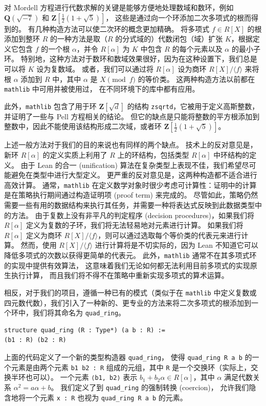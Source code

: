 \documentclass[sigplan,10pt,nonacm,
screen]{acmart} \settopmatter{printfolios=true,printccs=false,printacmref=false}
\newcommand{\mathlib}{\lstinline{mathlib}\xspace}
\newcommand{\QQ}{\mathbf{Q}}
\newcommand{\ZZ}{\mathbf{Z}}
\begin{document}
对 Mordell 方程进行代数求解的关键是能够方便地处理数域和数环，例如 $\QQ(\sqrt{-7})$ 和 $\ZZ\left[\frac{1}{2}(1 + \sqrt{5})\right]$，
    这些是通过向一个环添加二次多项式的根而得到的。
    有几种构造方法可以使二次环的概念更加精确。
    将多项式 $f \in R[X]$ 的根添加到整环 $R$ 的一种方法是取（$R$ 的分式域的）代数闭包（域）扩张 $K$，根据定义它包含 $f$ 的一个根 $\alpha$，并令 $R[\alpha]$ 为 $K$ 中包含 $R$ 的每个元素以及 $\alpha$ 的最小子环。
    特别地，这种方法对于数环和数域效果很好，因为在这种设置下，我们总是可以将 $K$ 设为复数域。
    或者，我们可以通过将 $R[\alpha]$ 设为商环 $R[X] / \langle f\rangle$ 来将根 $\alpha$ 添加到 $R$ 中，其中 $\alpha$ 是 $X \pmod f$ 的等价类。
    这两种构造方法以前都在 \mathlib 中可用并被使用过，
    在不同环境下的库中都有应用。

    此外，\mathlib 包含了用于环 $\ZZ[\sqrt d]$ 的结构 \lstinline{zsqrtd}，它被用于定义高斯整数，并证明了一些与 Pell 方程相关的结论。
    但它的缺点是只能将整数的平方根添加到整数中，因此不能使用该结构形成二次域，或者环 $\ZZ\left[\frac{1}{2}(1 + \sqrt{5})\right]$。

    上述一般方法对于我们的目的来说也有同样的两个缺点。
    技术上的反对意见是，新环 $R[\alpha]$ 的定义实质上利用了 $R$ 上的环结构，包括类型 $R[\alpha]$ 中环结构的定义。
    由于 Lean 的合一 (unification) 算法在复杂类型上表现不佳，我们希望尽可能避免在类型中进行大型定义。
    更严重的反对意见是，这两种构造都不适合进行高效计算。
    通常，\mathlib 在定义数学对象时很少考虑可计算性：证明中的计算是在策略执行期间通过构造证明项 (proof term) 来完成的。
    尽管如此，策略仍然需要一些有用的数据结构来执行其任务，并需要一种将表达式反映到此数据类型中的方法。
    由于复数上没有非平凡的判定程序 (decision procedures)，如果我们将 $R[\alpha]$ 定义为复数的子环，我们将无法轻易地对元素进行计算。
    如果我们将 $R[\alpha]$ 定义为商环 $R[X] / \langle f \rangle$，则可以通过选取每个等价类的代表元来进行计算。
    然而，使用 $R[X] / \langle f\rangle$ 进行计算将是不切实际的，因为 Lean 不知道它可以降低多项式的次数以获得更简单的代表元。
    此外，\mathlib 通常不在其多项式环的实现中提供有效算法，
    这意味着我们无论如何都无法利用目前多项式的实现原生执行计算，
    而且我们将不得不在策略中重新实现多项式的算术运算。

    相反，对于我们的项目，遵循一种已有的模式（类似于在 \mathlib 中定义复数或四元数代数），我们引入了一种新的、更专业的方法来将二次多项式的根添加到一个环中，我们将其命名为 \lstinline{quad_ring}。
\begin{lstlisting}
structure quad_ring (R : Type*) (a b : R) :=
(b1 : R) (b2 : R)
\end{lstlisting}
    上面的代码定义了一个新的类型构造器 \lstinline{quad_ring}，
    使得 \lstinline{quad_ring R a b} 的一个元素是由两个元素 \lstinline{b1 b2 : R} 组成的元组，其中 \lstinline{R} 是一个交换环（实际上，交换半环也可以）。
    一个元素 \lstinline{⟨b1, b2⟩} 表示 $b_1 + b_2 \alpha \in R[\alpha]$，其中 $\alpha$ 满足代数关系 $\alpha^2=a\alpha+b$。
    我们定义了到 \lstinline{quad_ring} 的强制转换 (coercion)，
    允许我们隐含地将一个元素 \lstinline{x : R} 也视为 \lstinline{quad_ring R a b} 的元素。
\end{document}
